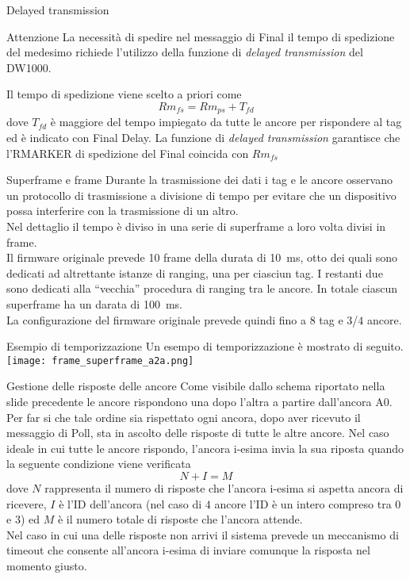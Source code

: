 \begin{frame}[label={delayed_tx}]{Delayed transmission}
  \begin{alertblock}{Attenzione}
    La necessità di spedire nel messaggio di Final il tempo di spedizione del medesimo richiede
    l'utilizzo della funzione di \emph{delayed transmission} del DW1000.
  \end{alertblock}
  Il tempo di spedizione viene scelto a priori come
  \[
  Rm_{fs} = Rm_{ps} + T_{fd}
  \]
  dove $T_{fd}$ è maggiore del tempo impiegato da \alert{tutte le ancore} per rispondere al tag ed è indicato
  con Final Delay.
  La funzione di \emph{delayed transmission} garantisce che l'RMARKER di spedizione del Final coincida con
  $Rm_{fs}$
\end{frame}

\begin{frame}{Superframe e frame}
  Durante la trasmissione dei dati i tag e le ancore osservano un protocollo di trasmissione
  \alert{a divisione di tempo} per evitare che un dispositivo possa interferire con la trasmissione
  di un altro.\\
  Nel dettaglio il tempo è diviso in una serie di \alert{superframe} a loro volta divisi in
  frame.\\
  Il firmware originale prevede 10 frame della durata di \SI{10}{\milli\second}, otto dei quali
  sono dedicati ad altrettante istanze di ranging, una per ciasciun tag. I restanti due sono dedicati
  alla ``vecchia'' procedura di ranging tra le ancore. In totale ciascun superframe ha un darata di \SI{100}{\milli\second}.\\
  La configurazione del firmware originale prevede quindi fino a $8$ tag e $3$/$4$ ancore.
\end{frame}

\begin{frame}{Esempio di temporizzazione}
  Un esempo di temporizzazione è mostrato di seguito.
  \centering
  \texttt{[image: frame\_superframe\_a2a.png]}
\end{frame}

\begin{frame}[shrink=10, label={anchors_responses_turn}]{Gestione delle risposte delle ancore}
  Come visibile dallo schema riportato nella slide precedente le ancore rispondono una dopo l'altra a partire
  dall'ancora A0.\\
  Per far si che tale ordine sia rispettato ogni ancora, dopo aver ricevuto il messaggio di Poll, sta in ascolto
  delle risposte di tutte le altre ancore. Nel caso ideale in cui tutte le ancore rispondo, l'ancora i-esima
  invia la sua riposta quando la seguente condizione viene verificata
  \[
  N + I = M
  \]
  dove $N$ rappresenta il numero di risposte che l'ancora i-esima si aspetta ancora di ricevere,
  $I$ è l'ID dell'ancora (nel caso di $4$ ancore l'ID è un intero compreso tra $0$ e $3$) ed $M$
  è il numero totale di risposte che l'ancora attende.\\
  Nel caso in cui una delle risposte non arrivi il sistema prevede un meccanismo di timeout che consente
  all'ancora i-esima di inviare comunque la risposta nel momento giusto.
\end{frame}

